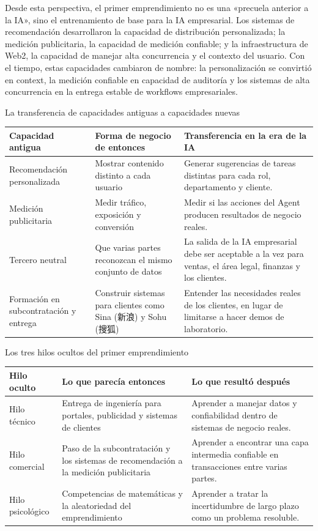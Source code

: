 \documentclass[a4paper]{article}
\begin{document}
Desde esta perspectiva, el primer emprendimiento no es una «precuela anterior a la IA», sino el entrenamiento de base para la IA empresarial. Los sistemas de recomendación desarrollaron la capacidad de distribución personalizada; la medición publicitaria, la capacidad de medición confiable; y la infraestructura de Web2, la capacidad de manejar alta concurrencia y el contexto del usuario. Con el tiempo, estas capacidades cambiaron de nombre: la personalización se convirtió en context, la medición confiable en capacidad de auditoría y los sistemas de alta concurrencia en la entrega estable de workflows empresariales.

\begin{knowledgebox}{La transferencia de capacidades antiguas a capacidades nuevas}
\begin{tabularx}{\textwidth}{p{}p{}X}
\toprule
Capacidad antigua & Forma de negocio de entonces & Transferencia en la era de la IA \\
\midrule
Recomendación personalizada & Mostrar contenido distinto a cada usuario & Generar sugerencias de tareas distintas para cada rol, departamento y cliente. \\
Medición publicitaria & Medir tráfico, exposición y conversión & Medir si las acciones del Agent producen resultados de negocio reales. \\
Tercero neutral & Que varias partes reconozcan el mismo conjunto de datos & La salida de la IA empresarial debe ser aceptable a la vez para ventas, el área legal, finanzas y los clientes. \\
Formación en subcontratación y entrega & Construir sistemas para clientes como Sina (新浪) y Sohu (搜狐) & Entender las necesidades reales de los clientes, en lugar de limitarse a hacer demos de laboratorio. \\
\bottomrule
\end{tabularx}
\end{knowledgebox}

\begin{knowledgebox}{Los tres hilos ocultos del primer emprendimiento}
\begin{tabularx}{\textwidth}{p{}p{}X}
\toprule
Hilo oculto & Lo que parecía entonces & Lo que resultó después \\
\midrule
Hilo técnico & Entrega de ingeniería para portales, publicidad y sistemas de clientes & Aprender a manejar datos y confiabilidad dentro de sistemas de negocio reales. \\
Hilo comercial & Paso de la subcontratación y los sistemas de recomendación a la medición publicitaria & Aprender a encontrar una capa intermedia confiable en transacciones entre varias partes. \\
Hilo psicológico & Competencias de matemáticas y la aleatoriedad del emprendimiento & Aprender a tratar la incertidumbre de largo plazo como un problema resoluble. \\
\bottomrule
\end{tabularx}
\end{knowledgebox}
\end{document}
